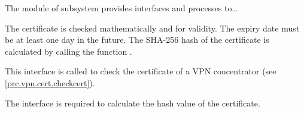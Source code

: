 


The module  of subsystem  provides interfaces
and processes to…



The certificate is checked mathematically and for validity. The expiry date must
be at least one day in the future. The SHA-256 hash of the certificate is
calculated by calling the function
.





This interface is called to check the certificate of a VPN concentrator (see
\autoref{prc.vpn.cert.checkcert}).


The interface  is required to
calculate the hash value of the certificate.

